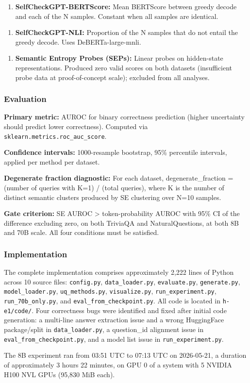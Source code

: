 \begin{enumerate}
\item \textbf{SelfCheckGPT-BERTScore:} Mean BERTScore between greedy decode and each of the N samples. Constant when all samples are identical.
\end{enumerate}

\begin{enumerate}
\item \textbf{SelfCheckGPT-NLI:} Proportion of the N samples that do not entail the greedy decode. Uses DeBERTa-large-mnli.
\end{enumerate}

\begin{enumerate}
\item \textbf{Semantic Entropy Probes (SEPs):} Linear probes on hidden-state representations. Produced zero valid scores on both datasets (insufficient probe data at proof-of-concept scale); excluded from all analyses.
\end{enumerate}

\subsubsection{Evaluation}

\textbf{Primary metric:} AUROC for binary correctness prediction (higher uncertainty should predict lower correctness). Computed via \texttt{sklearn.metrics.roc_auc_score}.

\textbf{Confidence intervals:} 1000-resample bootstrap, 95\% percentile intervals, applied per method per dataset.

\textbf{Degenerate fraction diagnostic:} For each dataset, degenerate_fraction = (number of queries with K=1) / (total queries), where K is the number of distinct semantic clusters produced by SE clustering over N=10 samples.

\textbf{Gate criterion:} SE AUROC > token-probability AUROC with 95\% CI of the difference excluding zero, on both TriviaQA and NaturalQuestions, at both 8B and 70B scale. All four conditions must be satisfied.

\subsubsection{Implementation}

The complete implementation comprises approximately 2,222 lines of Python across 10 source files: \texttt{config.py}, \texttt{data_loader.py}, \texttt{evaluate.py}, \texttt{generate.py}, \texttt{model_loader.py}, \texttt{uq_methods.py}, \texttt{visualize.py}, \texttt{run_experiment.py}, \texttt{run_70b_only.py}, and \texttt{eval_from_checkpoint.py}. All code is located in \texttt{h-e1/code/}. Four correctness bugs were identified and fixed after initial code generation: a multi-line answer extraction issue and a wrong HuggingFace package/split in \texttt{data_loader.py}, a question_id alignment issue in \texttt{eval_from_checkpoint.py}, and a model list issue in \texttt{run_experiment.py}.

The 8B experiment ran from 03:51 UTC to 07:13 UTC on 2026-05-21, a duration of approximately 3 hours 22 minutes, on GPU 0 of a system with 5 NVIDIA H100 NVL GPUs (95,830 MiB each).

